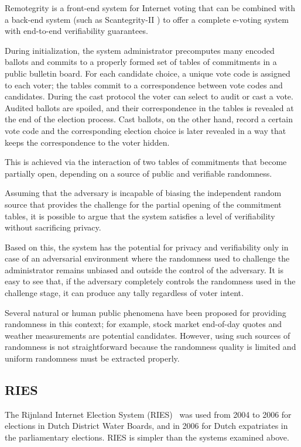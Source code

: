 Remotegrity \cite{zagorski2013} is a front-end system for Internet
voting that can be combined with a back-end system (such as
Scantegrity-II \cite{chaum2008scantegrity}) to offer a complete
e-voting system with end-to-end verifiability guarantees.

During initialization, the system administrator precomputes many
encoded ballots and commits to a properly formed set of tables of
commitments in a public bulletin board. For each candidate choice, a
unique vote code is assigned to each voter; the tables commit to a
correspondence between vote codes and candidates. During the cast
protocol the voter can select to audit or cast a vote. Audited ballots
are spoiled, and their correspondence in the tables is revealed at the
end of the election process. Cast ballots, on the other hand, record a
certain vote code and the corresponding election choice is later
revealed in a way that keeps the correspondence to the voter hidden.

This is achieved via the interaction of two tables of commitments that
become partially open, depending on a source of public and verifiable
randomness.

Assuming that the adversary is incapable of biasing the independent
random source that provides the challenge for the partial opening of
the commitment tables, it is possible to argue that the system
satisfies a level of verifiability without sacrificing privacy.

Based on this, the system has the potential for privacy and
verifiability only in case of an adversarial environment where the
randomness used to challenge the administrator remains unbiased and
outside the control of the adversary. It is easy to see that, if the
adversary completely controls the randomness used in the challenge
stage, it can produce any tally regardless of voter intent.

Several natural or human public phenomena have been proposed for
providing randomness in this context; for example, stock market
end-of-day quotes and weather measurements are potential candidates.
However, using such sources of randomness is not straightforward
because the randomness quality is limited and uniform randomness must
be extracted properly.

\subsection{RIES}

The Rijnland Internet Election System (RIES)~\cite{gonggrijp2009} was
used from 2004 to 2006 for elections in Dutch District Water Boards,
and in 2006 for Dutch expatriates in the parliamentary elections. RIES
is simpler than the systems examined above.

